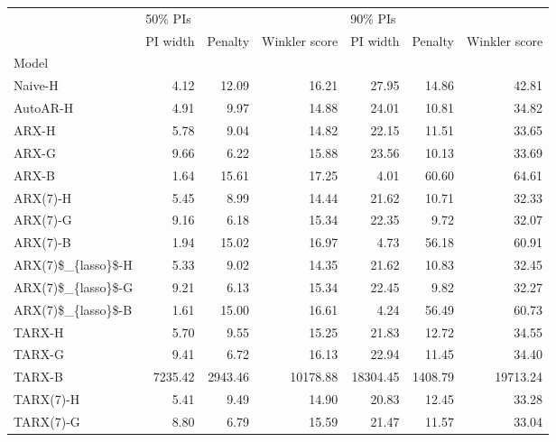 \begin{tabular}{lrrrrrr}
\toprule
{} & \multicolumn{3}{l}{50\% PIs} & \multicolumn{3}{l}{90\% PIs} \\
{} & PI width &  Penalty & Winkler score &  PI width &  Penalty & Winkler score \\
Model               &          &          &               &           &          &               \\
\midrule
Naive-H             &     4.12 &    12.09 &         16.21 &     27.95 &    14.86 &         42.81 \\
AutoAR-H            &     4.91 &     9.97 &         14.88 &     24.01 &    10.81 &         34.82 \\
ARX-H               &     5.78 &     9.04 &         14.82 &     22.15 &    11.51 &         33.65 \\
ARX-G               &     9.66 &     6.22 &         15.88 &     23.56 &    10.13 &         33.69 \\
ARX-B               &     1.64 &    15.61 &         17.25 &      4.01 &    60.60 &         64.61 \\
ARX(7)-H            &     5.45 &     8.99 &         14.44 &     21.62 &    10.71 &         32.33 \\
ARX(7)-G            &     9.16 &     6.18 &         15.34 &     22.35 &     9.72 &         32.07 \\
ARX(7)-B            &     1.94 &    15.02 &         16.97 &      4.73 &    56.18 &         60.91 \\
ARX(7)\$\_\{lasso\}\$-H  &     5.33 &     9.02 &         14.35 &     21.62 &    10.83 &         32.45 \\
ARX(7)\$\_\{lasso\}\$-G  &     9.21 &     6.13 &         15.34 &     22.45 &     9.82 &         32.27 \\
ARX(7)\$\_\{lasso\}\$-B  &     1.61 &    15.00 &         16.61 &      4.24 &    56.49 &         60.73 \\
TARX-H              &     5.70 &     9.55 &         15.25 &     21.83 &    12.72 &         34.55 \\
TARX-G              &     9.41 &     6.72 &         16.13 &     22.94 &    11.45 &         34.40 \\
TARX-B              &  7235.42 &  2943.46 &      10178.88 &  18304.45 &  1408.79 &      19713.24 \\
TARX(7)-H           &     5.41 &     9.49 &         14.90 &     20.83 &    12.45 &         33.28 \\
TARX(7)-G           &     8.80 &     6.79 &         15.59 &     21.47 &    11.57 &         33.04 \\

\end{tabular}

